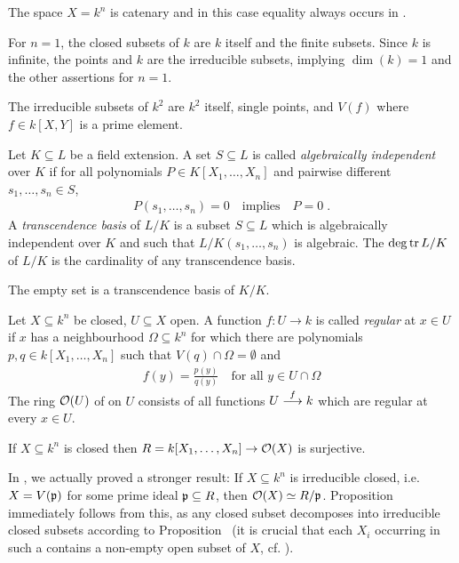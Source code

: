 \documentclass[a4paper,parskip=half,numbers=enddot, DIV=12]{scrreprt}
\begin{document}
\begin{thm}
	The space $X=k^n$ is catenary and in this case equality always occurs in .
\end{thm}
\begin{example}
	For $n=1$, the closed subsets of $k$ are $k$ itself and the finite subsets. Since $k$ is infinite, the points and $k$ are the irreducible subsets, implying $\dim(k) = 1 $ and the other assertions for $n=1$.
\end{example}
\begin{example}
	The irreducible subsets of $k^2$ are $k^2$ itself, single points, and $V(f)$ where $f\in k[X,Y]$ is a prime element.
\end{example}
\begin{defi}
	Let $K\subseteq L$ be a field extension. A set $S\subseteq L$ is called \emph{algebraically independent} over $K$ if for all polynomials $P\in K[X_1,\ldots,X_n]$ and pairwise different $s_1,\ldots, s_n\in S$, 
	\begin{align*}
	P(s_1,\ldots, s_n) =0\quad\text{implies}\quad P=0\;. 
	\end{align*}
	A \emph{transcendence basis} of $L/K$ is a subset $S\subseteq L$ which is algebraically independent over $K$ and such that $L/K(s_1,\ldots,s_n)$ is algebraic. The  $\deg\operatorname{tr} L/K$ of $L/K$ is the cardinality of any transcendence basis.
\end{defi}
\begin{example*}
	The empty set is a transcendence basis of $K/K$. 
\end{example*}
\begin{defi} 
	Let $X\subseteq k^n$ be closed, $U\subseteq X$ open. A function $f\colon U\to k$ is called \emph{regular} at $x\in U$ if $x$ has a neighbourhood $\Omega\subseteq k^n$ for which there are polynomials $p,q\in k[X_1,\ldots,X_n]$ such that $V(q)\cap \Omega=\emptyset$ and 
	\begin{align*}
	f(y) = \frac{p(y)}{q(y)}\quad\text{for all }y\in U\cap \Omega
	\end{align*}
	The ring $\mathcal{O}(U)$ of  on $U$ consists of all functions $U\morphism[f] k$ which are regular at every $x\in U$.
\end{defi}
\begin{prop}
	If $X\subseteq k^n$ is closed then $R= k[X_1,\ldots, X_n] \to \mathcal{O}(X)$ is surjective.
\end{prop}
In \cite[Proposition~2.2.2]{alg1}, we actually proved a stronger result: If $X\subseteq k^n$ is irreducible closed, i.e.\ $X=V(\mathfrak{p})$ for some prime ideal $\mathfrak{p}\subseteq R$, then $\mathcal{O}(X)\simeq R/\mathfrak{p}$. Proposition~ immediately follows from this, as any closed subset decomposes into irreducible closed subsets according to Proposition~ (it is crucial that each $X_i$ occurring in such a contains a non-empty open subset of $X$, cf. \cite[Proposition~2.1.1]{alg1}).
\end{document}
